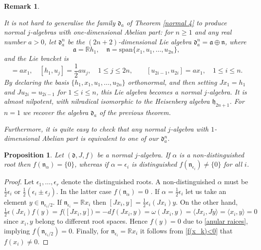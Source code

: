 \documentclass[12pt, twoside]{amsart}
\def\d{\mathfrak{d}}
\def\h{\mathfrak{h}}
\def\n{\mathfrak{n}}
\def\a{\mathfrak{a}}
\def\R{\mathbb{R}}
\renewcommand{\geq}{\geqslant}\renewcommand{\leq}{\leqslant}
\newtheorem{prop}[definition]{Proposition}
\newtheorem{rem}[definition]{Remark}
\theoremstyle{definition}
\begin{document}
\begin{rem}\label{rem: generalise}
{\rm 
It is not hard to generalise the family  $\d_a$ of Theorem \ref{normal 4} to produce normal $j$-algebras with one-dimensional Abelian part: for $n\geq 1$ and any real number $a>0$, let $\d_a^n$ be the $(2n+2)$-dimensional Lie algebra $\d_a^n=\a \oplus \n$, where 
\[\a=\R h_1, \quad \n=\text{span}\{x_1,u_1,\ldots,  u_{2n}\},\]
and the Lie bracket is 
 \begin{equation*}
      [h_1,x_1]=ax_1,\quad 
     [h_1,u_j]=\frac{1}{2}au_j, \quad 1\leq j\leq 2n,\qquad
     [u_{2i-1},u_{2i}]=ax_1, \quad 1 \leq i \leq n.
\end{equation*}
By declaring the basis $\{h_1,x_1,u_1,\ldots, u_{2n}\}$ orthonormal, and then setting $Jx_1=h_1$ and $Ju_{2i}=u_{2i-1}$ for $1\leq i\leq n$, this Lie algebra becomes a normal $j$-algebra. It is almost nilpotent, with nilradical isomorphic to the Heisenberg algebra $\h_{2n+1}$. 
For $n=1$ we recover the algebra $\d_a$ of the previous theorem. \par
\quad Furthermore, it is quite easy to check that any normal $j$-algebra with $1$-dimensional Abelian part is equivalent to one of our $\d_a^n$.}
\end{rem}

\bigbreak

\begin{prop} \label{ f se anula}
    Let  $(\d,J,f)$ be a  normal $j$-algebra. If $\alpha$ is a non-distinguished root then $f(\n_{\alpha})=\{0\}$, whereas if $\alpha=\epsilon_i$ is distinguished $f(\n_{\epsilon_i}) \neq \{0\}$ for all $i$.
 \end{prop}

\begin{proof}
Let $\epsilon_1,\ldots,  \epsilon_r$ denote the distinguished roots. A non-distinguished $\alpha$ must be $\tfrac{1}{2}\epsilon_{i}$ or $\tfrac{1}{2}(\epsilon_{i}\pm \epsilon_{j})$. In the latter case $f(\n_{\alpha})=0$ \cite{D}.  
If $\alpha= \tfrac{1}{2}\epsilon_{i}$ let us take an element $y \in \n_{\epsilon_i/2}$. If $\n_{\epsilon_i} =\R x_i$ then $[Jx_i, y]=\tfrac{1}{2}\epsilon_{i}(Jx_i)y$. On the other hand, 
\[ \tfrac{1}{2}\epsilon(Jx_i)f(y)= f\big([Jx_i, y]\big)=-df(Jx_i, y)=\omega(Jx_i, y)=\langle Jx_i, Jy \rangle=\langle x_i ,y \rangle=0  \]
since $x_i, y$ belong to different root spaces. Hence 
$f(y)=0$ due to \eqref{anular raices}, implying $f(\n_{\epsilon_i/2})=0$. Finally, for $\n_{\epsilon_i}=\R x_i$ it follows from \eqref{f(x_k)<0} that $f(x_i)\neq 0$.
\end{proof}
\end{document}

